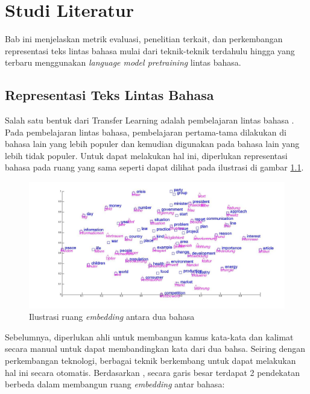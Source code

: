 \chapter{Studi Literatur}

Bab ini menjelaskan metrik evaluasi, penelitian terkait, dan perkembangan representasi teks lintas bahasa mulai dari teknik-teknik terdahulu hingga yang terbaru menggunakan \textit{language model pretraining} lintas bahasa. 

\section{Representasi Teks Lintas Bahasa}
    Salah satu bentuk dari Transfer Learning adalah pembelajaran lintas bahasa \parencite{ruder2019transfer}. Pada pembelajaran lintas bahasa, pembelajaran pertama-tama dilakukan di bahasa lain yang lebih populer dan kemudian digunakan pada bahasa lain yang lebih tidak populer. Untuk dapat melakukan hal ini, diperlukan representasi bahasa pada ruang yang sama seperti dapat dilihat pada ilustrasi di gambar \ref{fig:ilustrasi_embedding}.

    \begin{figure}[ht]
        \centering
        \includegraphics[width=1\textwidth]{resources/luong_et_al_2015.jpg}
        \caption{Ilustrasi ruang \textit{embedding} antara dua bahasa \parencite{Luong_Pham_Manning_2015}}
        \label{fig:ilustrasi_embedding}
    \end{figure}

    Sebelumnya, diperlukan ahli untuk membangun kamus kata-kata dan kalimat secara manual untuk dapat membandingkan kata dari dua bahsa. Seiring dengan perkembangan teknologi, berbagai teknik berkembang untuk dapat melakukan hal ini secara otomatis. Berdasarkan \parencite{Wang_Xie_Xu_Yang_Neubig_Carbonell_2019}, secara garis besar terdapat 2 pendekatan berbeda dalam membangun ruang \textit{embedding} antar bahasa:

